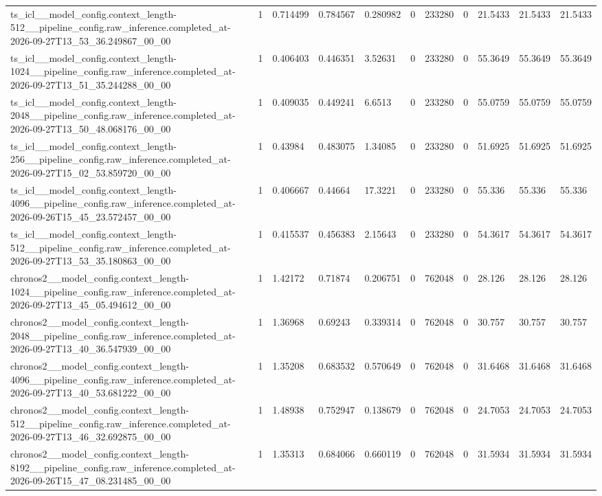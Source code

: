 \begin{tabular}{lllllllllll}
ts\_icl\_\_model\_config.context\_length-512\_\_pipeline\_config.raw\_inference.completed\_at-2026-09-27T13\_53\_36.249867\_00\_00 & 1 & 0.714499 & 0.784567 & 0.280982 & 0 & 233280 & 0 & 21.5433 & 21.5433 & 21.5433 \\
ts\_icl\_\_model\_config.context\_length-1024\_\_pipeline\_config.raw\_inference.completed\_at-2026-09-27T13\_51\_35.244288\_00\_00 & 1 & 0.406403 & 0.446351 & 3.52631 & 0 & 233280 & 0 & 55.3649 & 55.3649 & 55.3649 \\
ts\_icl\_\_model\_config.context\_length-2048\_\_pipeline\_config.raw\_inference.completed\_at-2026-09-27T13\_50\_48.068176\_00\_00 & 1 & 0.409035 & 0.449241 & 6.6513 & 0 & 233280 & 0 & 55.0759 & 55.0759 & 55.0759 \\
ts\_icl\_\_model\_config.context\_length-256\_\_pipeline\_config.raw\_inference.completed\_at-2026-09-27T15\_02\_53.859720\_00\_00 & 1 & 0.43984 & 0.483075 & 1.34085 & 0 & 233280 & 0 & 51.6925 & 51.6925 & 51.6925 \\
ts\_icl\_\_model\_config.context\_length-4096\_\_pipeline\_config.raw\_inference.completed\_at-2026-09-26T15\_45\_23.572457\_00\_00 & 1 & 0.406667 & 0.44664 & 17.3221 & 0 & 233280 & 0 & 55.336 & 55.336 & 55.336 \\
ts\_icl\_\_model\_config.context\_length-512\_\_pipeline\_config.raw\_inference.completed\_at-2026-09-27T13\_53\_35.180863\_00\_00 & 1 & 0.415537 & 0.456383 & 2.15643 & 0 & 233280 & 0 & 54.3617 & 54.3617 & 54.3617 \\
chronos2\_\_model\_config.context\_length-1024\_\_pipeline\_config.raw\_inference.completed\_at-2026-09-27T13\_45\_05.494612\_00\_00 & 1 & 1.42172 & 0.71874 & 0.206751 & 0 & 762048 & 0 & 28.126 & 28.126 & 28.126 \\
chronos2\_\_model\_config.context\_length-2048\_\_pipeline\_config.raw\_inference.completed\_at-2026-09-27T13\_40\_36.547939\_00\_00 & 1 & 1.36968 & 0.69243 & 0.339314 & 0 & 762048 & 0 & 30.757 & 30.757 & 30.757 \\
chronos2\_\_model\_config.context\_length-4096\_\_pipeline\_config.raw\_inference.completed\_at-2026-09-27T13\_40\_53.681222\_00\_00 & 1 & 1.35208 & 0.683532 & 0.570649 & 0 & 762048 & 0 & 31.6468 & 31.6468 & 31.6468 \\
chronos2\_\_model\_config.context\_length-512\_\_pipeline\_config.raw\_inference.completed\_at-2026-09-27T13\_46\_32.692875\_00\_00 & 1 & 1.48938 & 0.752947 & 0.138679 & 0 & 762048 & 0 & 24.7053 & 24.7053 & 24.7053 \\
chronos2\_\_model\_config.context\_length-8192\_\_pipeline\_config.raw\_inference.completed\_at-2026-09-26T15\_47\_08.231485\_00\_00 & 1 & 1.35313 & 0.684066 & 0.660119 & 0 & 762048 & 0 & 31.5934 & 31.5934 & 31.5934 \\

\end{tabular}
